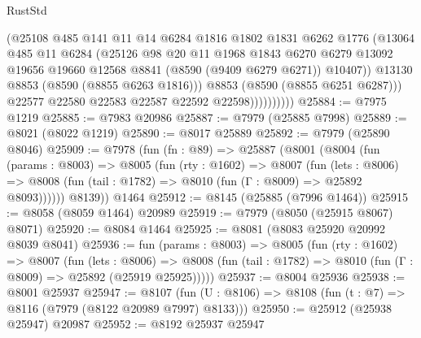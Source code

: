 \begin{lexlean}{RustStd}
\begin{coremodule}
                          (@25108
                            @485
                            @141
                            @11
                            @14
                            @6284
                            @1816
                            @1802
                            @1831
                            @6262
                            @1776
                            (@13064
                              @485
                              @11
                              @6284
                              (@25126
                                @98
                                @20
                                @11
                                @1968
                                @1843
                                @6270
                                @6279
                                @13092
                                @19656
                                @19660
                                @12568
                                @8841
                                (@8590 (@9409 @6279 @6271))
                                @10407))
                            @13130
                            @8853
                            (@8590 (@8855 @6263 @1816)))
                          @8853
                          (@8590 (@8855 @6251 @6287)))
                        @22577
                        @22580
                        @22583
                        @22587
                        @22592
                        @22598))))))))))
@25884 := @7975 @1219
@25885 := @7983 @20986
@25887 := @7979 (@25885 @7998)
@25889 := @8021 (@8022 @1219)
@25890 := @8017 @25889
@25892 := @7979 (@25890 @8046)
@25909 := @7978
    (fun (fn : @89) =>
    @25887
      (@8001
        (@8004
          (fun (params : @8003) =>
          @8005
            (fun (rty : @1602) =>
            @8007
              (fun (lets : @8006) =>
              @8008 (fun (tail : @1782) => @8010 (fun (Γ : @8009) => @25892 @8093))))))
        @8139))
    @1464
@25912 := @8145 (@25885 (@7996 @1464))
@25915 := @8058 (@8059 @1464) @20989
@25919 := @7979 (@8050 (@25915 @8067) @8071)
@25920 := @8084 @1464
@25925 := @8081 (@8083 @25920 @20992 @8039 @8041)
@25936 := fun (params : @8003) =>
  @8005
    (fun (rty : @1602) =>
    @8007
      (fun (lets : @8006) =>
      @8008 (fun (tail : @1782) => @8010 (fun (Γ : @8009) => @25892 (@25919 @25925)))))
@25937 := @8004 @25936
@25938 := @8001 @25937
@25947 := @8107
    (fun (U : @8106) => @8108 (fun (t : @7) => @8116 (@7979 (@8122 @20989 @7997) @8133)))
@25950 := @25912 (@25938 @25947) @20987
@25952 := @8192 @25937 @25947

\end{coremodule}
\end{lexlean}

